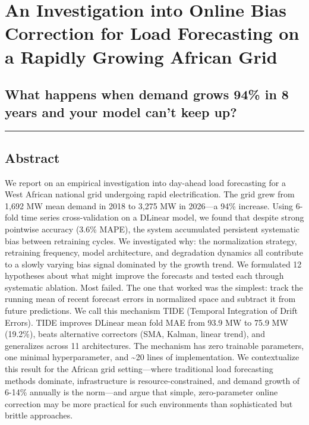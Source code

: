 \section{An Investigation into Online Bias Correction for Load
Forecasting on a Rapidly Growing African
Grid}\label{an-investigation-into-online-bias-correction-for-load-forecasting-on-a-rapidly-growing-african-grid}

\subsection{What happens when demand grows 94\% in 8 years and your
model can't keep
up?}\label{what-happens-when-demand-grows-94-in-8-years-and-your-model-cant-keep-up}

\begin{center}\rule{0.5\linewidth}{0.5pt}\end{center}

\subsection{Abstract}\label{abstract}

We report on an empirical investigation into day-ahead load forecasting
for a West African national grid undergoing rapid electrification. The
grid grew from 1,692 MW mean demand in 2018 to 3,275 MW in 2026---a 94\%
increase. Using 6-fold time series cross-validation on a DLinear model,
we found that despite strong pointwise accuracy (3.6\% MAPE), the system
accumulated persistent systematic bias between retraining cycles. We
investigated why: the normalization strategy, retraining frequency,
model architecture, and degradation dynamics all contribute to a slowly
varying bias signal dominated by the growth trend. We formulated 12
hypotheses about what might improve the forecasts and tested each
through systematic ablation. Most failed. The one that worked was the
simplest: track the running mean of recent forecast errors in normalized
space and subtract it from future predictions. We call this mechanism
TIDE (Temporal Integration of Drift Errors). TIDE improves DLinear mean
fold MAE from 93.9 MW to 75.9 MW (19.2\%), beats alternative correctors
(SMA, Kalman, linear trend), and generalizes across 11 architectures.
The mechanism has zero trainable parameters, one minimal hyperparameter,
and \textasciitilde20 lines of implementation. We contextualize this
result for the African grid setting---where traditional load forecasting
methods dominate, infrastructure is resource-constrained, and demand
growth of 6-14\% annually is the norm---and argue that simple,
zero-parameter online correction may be more practical for such
environments than sophisticated but brittle approaches.

